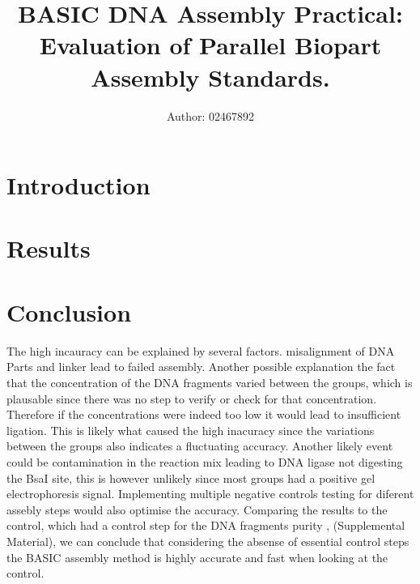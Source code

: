 \documentclass[11pt]{cls/labreport}
\title{\vspace*{2cm} BASIC DNA Assembly Practical: Evaluation of Parallel Biopart Assembly Standards.}
\author[1]{Author: 02467892}
\affil[1]{Mres Systems and Synthetic Biology$^{\ast}$}
\begin{document}
\maketitle
\thispagestyle{firststyle}
\vspace{-13pt}%

\begin{multicols}{2}
\section{Introduction}
    \introduction
    
\section{Results}
    \results


\section{Conclusion}
The high incauracy can be explained by several factors. misalignment of DNA Parts and linker lead to failed assembly. Another possible explanation the fact that the concentration of the 
DNA fragments varied between the groups, which is plausable since there was no step to verify or check for that concentration. Therefore if the concentrations were indeed too low it would
lead to insufficient ligation. This is likely what caused the high inacuracy since the variations between the groups also indicates a fluctuating accuracy. Another likely event could be contamination
in the reaction mix leading to DNA ligase not digesting the BsaI site, this is however unlikely since most groups had a positive gel electrophoresis signal. Implementing multiple negative controls testing for diferent assebly steps would also optimise the accuracy.
Comparing the results to the control, which had a control step for the DNA fragments purity \cite{Storch2015}, (Supplemental Material), we can conclude that considering the absense of
essential control steps the BASIC assembly method is highly accurate and fast when looking at the control.

\printbibliography

\end{multicols}
\end{document}
